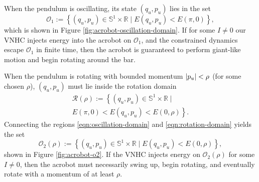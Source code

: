 \documentclass[journal,twoside,web, onecolumn, draftcls]{ieeecolor}
\DeclarePairedDelimiter{\abs}{\lvert}{\rvert}
\newcommand*{\R}{\mathbb{R}}
\newcommand*{\Sone}{\mathbb{S}^1}
\newcommand*{\SxR}{\Sone \times \R}
\begin{document}
When the pendulum is oscillating, its state \((q_u,p_u)\) lies in the set
\begin{equation}\label{eqn:oscillation-domain}
    \mathcal{O}_1 := \left\{(q_u,p_u) \in \SxR 
    \mid E(q_u,p_u) < E(\pi,0) \right\}
    ,
\end{equation}
which is shown in Figure \ref{fig:acrobot-oscillation-domain}.
If for some \(I \neq 0\) our VNHC injects energy into the acrobot on 
\(\mathcal{O}_1\), and the constrained dynamics escape
\(\mathcal{O}_1\) in finite time, then the acrobot is guaranteed to perform
giant-like motion and begin rotating around the bar.

When the pendulum is rotating with bounded momentum
\(\abs{p_u} < \rho\) (for some chosen \(\rho\)),
\((q_u,p_u)\) must lie inside the rotation domain
\begin{multline}\label{eqn:rotation-domain}
    \mathcal{R}(\rho) := \left\{
        (q_u,p_u) \in \SxR \mid\right.
        \\
        \left.E(\pi,0) < E(q_u,p_u) < E(0,\rho)
    \right\}
    .
\end{multline}
Connecting the regions \eqref{eqn:oscillation-domain} and
\eqref{eqn:rotation-domain} yields the set
\begin{equation}\label{eqn:o-rhobar}
    \mathcal{O}_2(\rho) := \left\{(q_u,p_u) \in \SxR
        \mid E(q_u,p_u) < E(0,\rho) \right\}
    ,
\end{equation}
shown in Figure \ref{fig:acrobot-o2}.
If the VNHC injects energy on \(\mathcal{O}_2(\rho)\) for some 
\(I \neq 0\), then the acrobot must necessarily swing up, begin rotating, 
and eventually rotate with a momentum of at least \(\rho\).
\end{document}
